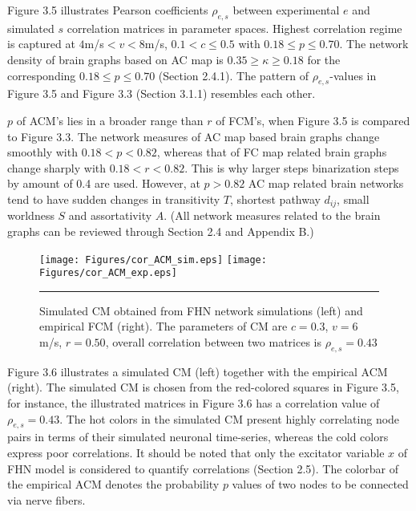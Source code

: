 Figure 3.5 illustrates Pearson coefficients $\rho_{e,s}$ between experimental $e$ and simulated $s$ correlation matrices in parameter spaces. Highest correlation regime is captured at $4$m/s$<v<8$m/s, $0.1 < c \leq 0.5$ with $0.18 \leq p \leq 0.70 $. The network density of brain graphs based on AC map is $0.35 \geq   \kappa \geq 0.18$ for the corresponding $0.18 \leq p \leq 0.70 $ (Section 2.4.1). The pattern of $\rho_{e,s}$-values in Figure 3.5 and Figure 3.3 (Section 3.1.1) resembles each other. 

$p$ of ACM's lies in a broader range than $r$ of FCM's, when Figure 3.5 is compared to Figure 3.3. The network measures of AC map based brain graphs change smoothly with $0.18<p<0.82$, whereas that of FC map related brain graphs change sharply with $0.18<r<0.82$. This is why larger steps binarization steps by amount of 0.4 are used. However, at $p>0.82$ AC map related brain networks tend to have sudden changes in transitivity $T$, shortest pathway $d_{ij}$, small worldness $S$  and assortativity $A$. (All network measures related to the brain graphs can be reviewed through Section 2.4 and Appendix B.)

\begin{figure}[htbp]
 
  \centering
	 \texttt{[image: Figures/cor\_ACM\_sim.eps]} 
   	 \texttt{[image: Figures/cor\_ACM\_exp.eps]} 

    \rule{35em}{0.5pt}
  \caption[High Correlated FHN Simulation, ACM]{ Simulated CM obtained from FHN network simulations (left) and empirical FCM (right). The parameters of CM are $c=0.3$, $v=6$ m/s, $r=0.50$, overall correlation between two matrices is $\rho_{e,s} = 0.43$ }
    \label{fig:High Correlated FHN Simulation, ACM}
 	
\end{figure}

Figure 3.6 illustrates a simulated CM (left) together with the empirical ACM (right). The simulated CM is chosen from the red-colored squares in Figure 3.5, for instance, the illustrated matrices in Figure 3.6 has a correlation value of $\rho_{e,s}=0.43$. The hot colors in the simulated CM present highly correlating node pairs in terms of their simulated neuronal time-series, whereas the cold colors express poor correlations. It should be noted that only the excitator variable $x$ of FHN model is considered to quantify correlations (Section 2.5). The colorbar of the empirical ACM denotes the probability $p$ values of two nodes to be connected via nerve fibers.
 
